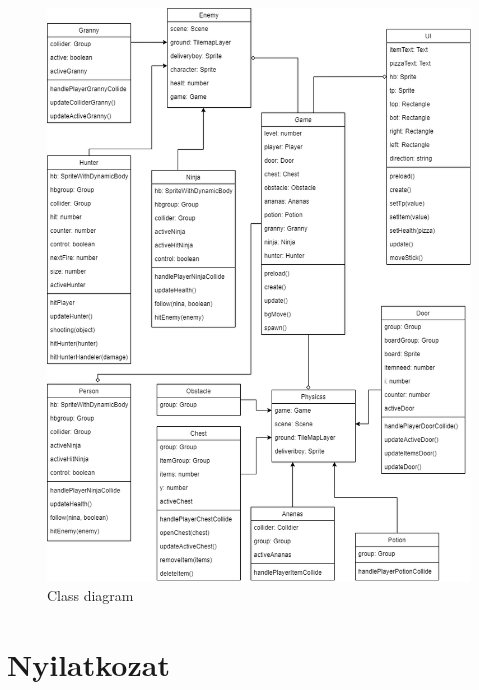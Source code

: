 \documentclass[12pt, a4paper]{report}
\theoremstyle{definition}
\begin{document}
	\begin{figure}[!h]
		\centering
		\includegraphics[width=1\linewidth]{./images/class.png}
		\caption{Class diagram}
		\label{fig:class}
	\end{figure}
	
	\chapter*{Nyilatkozat}
	
	
\end{document}
